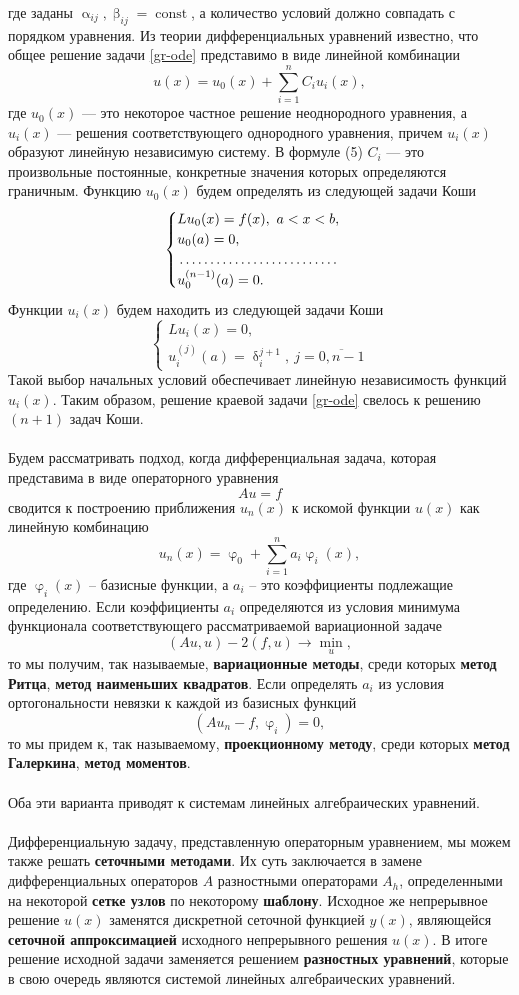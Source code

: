 \documentclass[a4paper, 12pt]{report}
\numberwithin{equation}{section}
\renewcommand{\alpha}{\upalpha}
\renewcommand{\beta}{\upbeta}
\renewcommand{\delta}{\updelta}
\renewcommand{\varphi}{\upvarphi}
\begin{document}
	где заданы $\alpha_{ij}, \beta_{ij} = \operatorname{const}$, а количество условий должно совпадать с порядком уравнения.
	Из теории дифференциальных уравнений известно, что общее решение задачи \eqref{gr-ode} представимо в виде линейной комбинации $$u(x) = u_0(x) + \sum_{i=1}^{n}C_iu_i(x),$$
	где $u_0(x)$ --- это некоторое частное решение неоднородного уравнения, а $u_i(x)$ --- решения соответствующего однородного уравнения, причем $u_i(x)$ образуют линейную независимую систему. В формуле (5) $C_i$ --- это произвольные постоянные, конкретные значения которых определяются граничным.
	Функцию $u_0(x)$ будем определять из следующей задачи Коши
	$$\begin{cases}
		L u_0(x) = f(x),\ a<x< b,\\
		u_0(a) = 0,\\
		\dotfill\\
		u_0^{(n-1)}(a) = 0.
	\end{cases}$$
	Функции $u_i(x)$ будем находить из следующей задачи Коши
	$$
	\begin{cases}
		L u_i(x) = 0,\\
		u_i^{(j)}(a)  = \delta_i^{j+1},\ j = \overline{0,n-1}
	\end{cases}
	$$
	Такой выбор начальных условий обеспечивает линейную независимость функций $u_i(x)$.
	Таким образом, решение краевой задачи \eqref{gr-ode} свелось к решению $(n+1)$ задач Коши.
	\\\\
	Будем рассматривать подход, когда дифференциальная задача, которая представима в виде операторного уравнения $$Au = f$$ сводится к построению приближения $u_n(x)$ к искомой функции $u(x)$ как линейную комбинацию
	$$u_n(x) = \varphi_0 + \sum_{i=1}^n a_i \varphi_i(x),$$
	где $\varphi_i(x)$ -- базисные функции, а $a_i$ -- это коэффициенты подлежащие определению. Если коэффициенты $a_i$ определяются из условия минимума функционала соответствующего рассматриваемой вариационной задаче $$(Au,u)-2(f,u)\to \underset{u}{\min},$$ то мы получим, так называемые, \textbf{вариационные методы}, среди которых \textbf{метод Ритца}, \textbf{метод наименьших квадратов}. Если определять $a_i$ из условия ортогональности невязки к каждой из базисных функций $$(Au_n - f, \varphi_i) =0,$$ то мы придем к, так называемому, \textbf{проекционному методу}, среди которых \textbf{метод Галеркина}, \textbf{метод моментов}.\\\\
	Оба эти варианта приводят к системам линейных алгебраических уравнений.
	\\\\
	Дифференциальную задачу, представленную операторным уравнением, мы можем также решать \textbf{сеточными методами}. Их суть заключается в замене дифференциальных операторов $A$ разностными операторами $A_h$, определенными на некоторой \textbf{сетке узлов} по некоторому \textbf{шаблону}. Исходное же непрерывное решение $u(x)$ заменятся дискретной сеточной функцией $y(x)$, являющейся \textbf{сеточной аппроксимацией} исходного непрерывного решения $u(x)$. В итоге решение исходной задачи заменяется решением \textbf{разностных уравнений}, которые в свою очередь являются системой линейных алгебраических уравнений.
\end{document}
